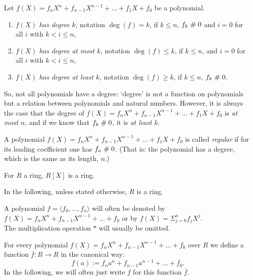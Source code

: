 \begin{definition}\label{defdegpol}
Let $f(X)=f_n X^n+f_{n-1}X^{n-1}+\ldots + f_1 X+f_0$ be a polynomial.
\begin{enumerate}
\item $f(X)$ {\em has degree $k$}, notation $\deg(f) = k$, if
$k\leq n$, $f_k \mathrel{\#} 0$ and $i=0$ for all $i$ with $k< i \leq n$,\\
\item $f(X)$ {\em has degree at most $k$}, notation $\deg(f) \leq k$,
if $k\leq n $, and $i=0$ for all $i$ with $k< i \leq n$,\\
\item $f(X)$ {\em has degree at least $k$}, notation $\deg(f) \geq k$,
if $k\leq n $, $f_k \mathrel{\#} 0$.
\end{enumerate}
So, not all polynomials have a degree: `degree' is not a function on
polynomials but a relation between polynomials and natural
numbers. However, it is always the case that 
the degree of $f(X)=f_n X^n+f_{n-1}X^{n-1}+\ldots + f_1 X+f_0$ is {\em
at most $n$}, and if we know that $f_k \mathrel{\#} 0$, it is {\em at least
$k$}.
\end{definition}

\begin{definition}\label{defregpol}
A polynomial $f(X)=f_n X^n+f_{n-1}X^{n-1}+\ldots + f_1 X+f_0$ is called
{\em regular} if for its leading coefficient one has $f_n\mathrel{\#}
0$. (That is: the polynomial has a degree, which is the same as its
length, $n$.) 
\end{definition}

\begin{lemma}\label{lempolring} For $R$ a ring, $R[X]$ is a ring.
\end{lemma}

In the following, unless stated otherwise, $R$ is a ring.

\begin{notation}
A polynomial $f= \langle f_0, \ldots, f_n\rangle$ will often be denoted by
$ f(X) = f_n X^n + f_{n-1} X^{n-1} + \ldots + f_0$ or by $f(X)=
\Sigma_{j=0}^n f_j X^j$.\\
The multiplication operation $*$ will usually be omitted.
\end{notation}

\begin{definition}\label{defpolyfun} For every polynomial $f(X)= f_n X^n
  + f_{n-1} 
  X^{n-1} + \ldots + f_0$  over $R$ we define a
  function $\overline{f}:R\rightarrow R$ in the canonical way:
$$f(a):=f_n a^n + f_{n-1}   a^{n-1} + \ldots + f_0.$$
In the following, we will often just write $f$ for this function
$\overline{f}$. 
\end{definition}

